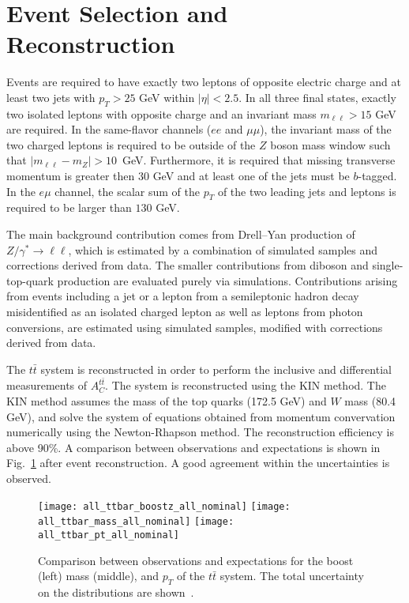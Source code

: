\documentclass[12pt]{article}
\begin{document}
\section{Event Selection and Reconstruction}

Events are required to have exactly two leptons of opposite electric charge and at least two jets with $p_{T}>25$ GeV within $|\eta|<2.5$. In all three final states, exactly two isolated leptons with opposite
charge and an invariant mass $m_{\ell  \ell} > 15$ GeV are required.
In the same-flavor channels ($ee$ and $\mu\mu$),
the invariant mass of the two charged leptons is required to be
outside of the $Z$ boson mass window such
that \mbox{$|m_{\ell \ell}-m_Z|>10$  GeV}.
Furthermore, it is required that missing transverse momentum is greater then $30$ GeV and at
least one of the jets must be $b$-tagged. In the $e\mu$ channel,  the scalar sum of the $p_{T}$ of the two leading jets and
leptons is required to be larger than $130$ GeV.

The main background contribution comes from Drell--Yan production
of $Z/\gamma^{*} \rightarrow \ell \ell$, which is estimated by a combination of simulated samples and corrections
derived from data. The smaller contributions from diboson
and single-top-quark production are evaluated purely via simulations. Contributions arising from  events including a jet or a lepton from a semileptonic hadron decay
misidentified as an isolated charged lepton as well as leptons from photon conversions, are estimated using simulated samples, modified with corrections
derived from data.

The $t\bar{t}$ system is reconstructed in order to perform the inclusive and differential measurements of $A_C^{t\bar{t}}$. The system is reconstructed using the KIN method. The KIN method assumes the mass of the top quarks (172.5 GeV) and $W$ mass (80.4 GeV), and solve the system of equations obtained from momentum convervation numerically using the Newton-Rhapson method. The reconstruction efficiency is above 90\%. A comparison between observations and expectations is shown in Fig.~\ref{fig:magnet} after event reconstruction. A good agreement within the uncertainties is observed.

\begin{figure}[htb]
\centering
\texttt{[image: all\_ttbar\_boostz\_all\_nominal]}
\texttt{[image: all\_ttbar\_mass\_all\_nominal]}
\texttt{[image: all\_ttbar\_pt\_all\_nominal]}
\caption{Comparison between observations and expectations for the boost (left) mass (middle), and $p_T$ of the $t\bar{t}$ system. The total uncertainty on the distributions are shown~\cite{Aad:2016ove}. }
\label{fig:magnet}
\end{figure}
\end{document}
